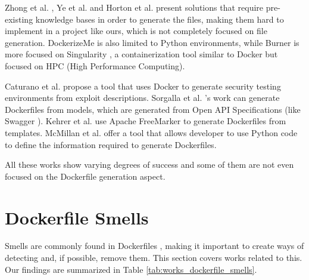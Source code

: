 

Zhong et al. \cite{zhongBurnerRecipeAutomatic2022}, Ye et al. \cite{yeDockerGenKnowledgeGraph2021} and Horton et al. \cite{hortonDockerizeMeAutomaticInference2019} present solutions that require pre-existing knowledge bases in order to generate the files, making them hard to implement in a project like ours, which is not completely focused on file generation. DockerizeMe is also limited to Python environments, while Burner is more focused on Singularity \cite{Apptainer}, a containerization tool similar to Docker but focused on HPC (High Performance Computing).

Caturano et al. \cite{caturanoExploitWP2DockerPlatformAutomating2022} propose a tool that uses Docker to generate security testing environments from exploit descriptions. Sorgalla et al. \cite{sorgallaApplyingModelDrivenEngineering2021}'s work can generate Dockerfiles from models, which are generated from Open API Specifications (like Swagger \cite{Swagger}). Kehrer et al. \cite{kehrerContainerBasedModuleIsolation2019} use Apache FreeMarker \cite{ApacheFreeMarker} to generate Dockerfiles from templates. McMillan et al. \cite{mcmillanMAKINGCONTAINERSEASIER} offer a tool that allows developer to use Python code to define the information required to generate Dockerfiles.

All these works show varying degrees of success and some of them are not even focused on the Dockerfile generation aspect.

\section{Dockerfile Smells} \label{sec:dockerfile_smells}

Smells are commonly found in Dockerfiles \cite{wuCharacterizingOccurrenceDockerfile2020}, making it important to create ways of detecting and, if possible, remove them. This section covers works related to this. Our findings are summarized in Table \ref{tab:works_dockerfile_smells}.

